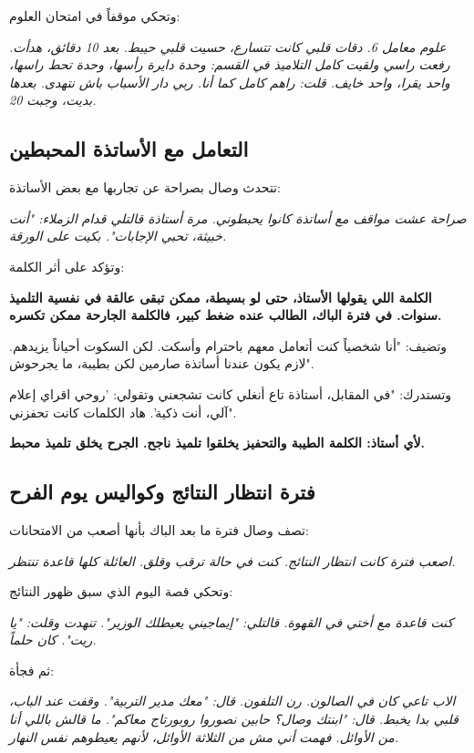 \documentclass[12pt,a4paper]{book}
\newcommand{\quoteAr}[1]{%
	\begin{myquote}
		\itshape #1
	\end{myquote}
}
\newcommand{\importantAr}[1]{%
	\begin{important}
		\bfseries #1
	\end{important}
}
\begin{document}
	وتحكي موقفاً في امتحان العلوم:
	
	\quoteAr{علوم معامل 6. دقات قلبي كانت تتسارع، حسيت قلبي حيبط. بعد 10 دقائق، هدأت. رفعت راسي ولقيت كامل التلاميذ في القسم: وحدة دايرة رأسها، وحدة تحط راسها، واحد يقرا، واحد خايف. قلت: راهم كامل كما أنا. ربي دار الأسباب باش نتهدى. بعدها بديت، وجبت 20.}
	
	\subsection{التعامل مع الأساتذة المحبطين}
	
	تتحدث وصال بصراحة عن تجاربها مع بعض الأساتذة:
	
	\quoteAr{صراحة عشت مواقف مع أساتذة كانوا يحبطوني. مرة أستاذة قالتلي قدام الزملاء: "أنت خبيثة، تحبي الإجابات". بكيت على الورقة.}
	
	وتؤكد على أثر الكلمة:
	
	\importantAr{الكلمة اللي يقولها الأستاذ، حتى لو بسيطة، ممكن تبقى عالقة في نفسية التلميذ سنوات. في فترة الباك، الطالب عنده ضغط كبير، فالكلمة الجارحة ممكن تكسره.}
	
	وتضيف: "أنا شخصياً كنت أتعامل معهم باحترام وأسكت. لكن السكوت أحياناً يزيدهم. لازم يكون عندنا أساتذة صارمين لكن بطيبة، ما يجرحوش".
	
	وتستدرك: "في المقابل، أستاذة تاع أنغلي كانت تشجعني وتقولي: 'روحي اقراي إعلام آلي، أنت ذكية'. هاد الكلمات كانت تحفزني".
	
	\importantAr{لأي أستاذ: الكلمة الطيبة والتحفيز يخلقوا تلميذ ناجح. الجرح يخلق تلميذ محبط.}
	
	\subsection{فترة انتظار النتائج وكواليس يوم الفرح}
	
	تصف وصال فترة ما بعد الباك بأنها أصعب من الامتحانات:
	
	\quoteAr{اصعب فترة كانت انتظار النتائج. كنت في حالة ترقب وقلق. العائلة كلها قاعدة تنتظر.}
	
	وتحكي قصة اليوم الذي سبق ظهور النتائج:
	
	\quoteAr{كنت قاعدة مع أختي في القهوة. قالتلي: "إيماجيني يعيطلك الوزير". تنهدت وقلت: "يا ريت". كان حلماً.}
	
	ثم فجأة:
	
	\quoteAr{الاب تاعي كان في الصالون. رن التلفون. قال: "معك مدير التربية". وقفت عند الباب، قلبي بدا يخبط. قال: "ابنتك وصال؟ حابين نصوروا روبورتاج معاكم". ما قالش باللي أنا من الأوائل. فهمت أني مش من الثلاثة الأوائل، لأنهم يعيطوهم نفس النهار.}
	
\end{document}
